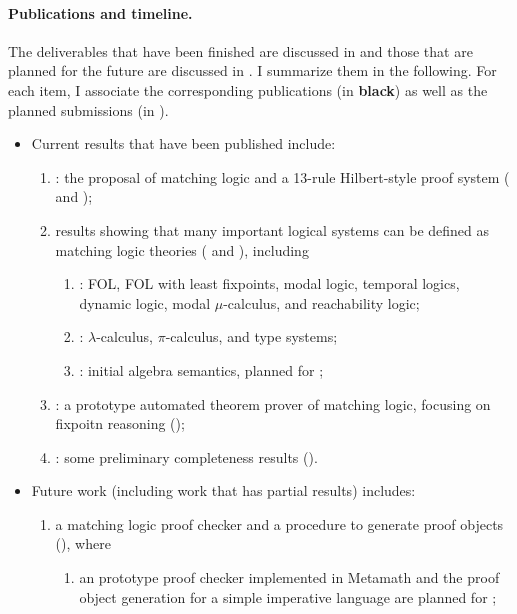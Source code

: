 \documentclass[11pt]{article}
\begin{document}
\paragraph{Publications and timeline.}

The deliverables that have been finished are discussed in 
and those that are planned for the future are discussed in 
. 
I summarize them in the following.
For each item, I associate the corresponding publications (in \textbf{black}) 
as well as the planned submissions (in \textbf{}).

\begin{itemize}
\item Current results that have been published include:
\begin{enumerate}
\item \textbf{\cite[LICS2019]{CR19}}: the proposal of matching logic and a 13-rule Hilbert-style proof system 
( and );
\item results showing that many important logical systems can be defined as matching logic theories ( and ), including
\begin{enumerate}
\item \textbf{\cite[LICS2019]{CR19}}: FOL, FOL with least fixpoints, modal logic, temporal logics, dynamic logic, modal $\mu$-calculus, and reachability logic;
\item \textbf{\cite[ICFP2020]{CR20}}: $\lambda$-calculus, $\pi$-calculus, and type systems;
\item \textbf{\cite[TechRep2020]{CLR20}}: initial algebra semantics, planned for \textbf{\plan{[LICS2021]}};
\end{enumerate}
\item \textbf{\cite[OOPSLA2020]{CTR20}}: 
a prototype  automated theorem prover of matching logic, focusing on fixpoitn reasoning ();
\item \textbf{\cite[LICS2019]{CR19}}: some preliminary completeness results ().
\end{enumerate}
\item Future work (including work that has partial results) includes:
\begin{enumerate}
\item a matching logic proof checker and a procedure to generate proof objects (), where
\begin{enumerate}
\item an prototype proof checker implemented in Metamath and the proof object generation for a simple imperative language are planned for \textbf{\plan{[CAV2021]}};

\end{enumerate}
\end{enumerate}
\end{itemize}
\end{document}
